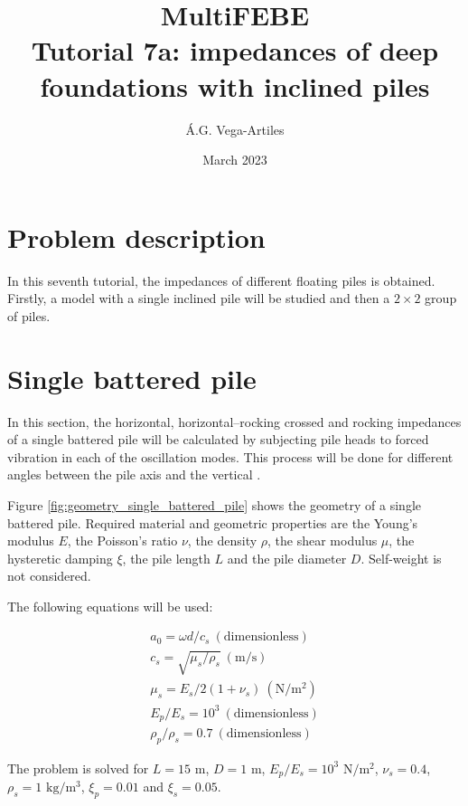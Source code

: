 \documentclass[a4]{article}
\title{MultiFEBE \\ Tutorial 7a: impedances of deep foundations with inclined piles}
\author{\'A.G. Vega-Artiles}
\date{March 2023}
\begin{document}
\maketitle

\tableofcontents 

\section{Problem description}

In this seventh tutorial, the impedances of different floating piles is obtained. Firstly, a model with a single inclined pile will be studied and then a $2 \times 2 $ group of piles. 
 
\section{Single battered pile}

In this section, the horizontal, horizontal–rocking crossed and rocking impedances of a single battered pile will be calculated by subjecting pile heads to forced vibration in each of the oscillation modes. This process will be done for different angles between the pile axis and the vertical \cite{padron}.

Figure \ref{fig:geometry_single_battered_pile} shows the geometry of a single battered pile. Required material and geometric properties are the Young's modulus $E$, the Poisson's ratio $\nu$, the density $\rho$, the shear modulus $\mu$, the hysteretic damping $\xi$, the pile length $L$ and the pile diameter $D$. Self-weight is not considered.

The following equations will be used: 

\begin{equation}
	\begin{array}{l}
		a_0 = \omega d/c_s \medspace \mathrm{(dimensionless)} \\
		c_s = \sqrt{\mu_s/\rho_s}\medspace \mathrm{(m/s)} \\
		\mu_s = E_s/2(1+\nu_s)\medspace \mathrm{(N/m^2)} \\
		E_p/E_s= 10^3 \medspace \mathrm{(dimensionless)} \\
		\rho_p/\rho_s=0.7 \medspace \mathrm{(dimensionless)}
	\end{array}
\end{equation}

The problem is solved for $L=15$ $\mathrm{m}$, $D=1$ $\mathrm{m}$, $E_p/E_s= 10^3$ $\mathrm{N/m^2}$, $\nu_s=0.4$, $\rho_s=1$ $\mathrm{kg/m^3}$, $\xi_p=0.01$ and  $\xi_s=0.05$.
\end{document}
